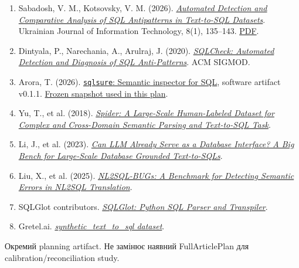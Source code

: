\documentclass[11pt,a4paper]{article}
\begin{document}
\begin{enumerate}
\item Sabadosh, V. M., Kotsovsky, V. M. (2026).
  \href{https://doi.org/10.23939/ujit2026.01.135}
  {\textit{Automated Detection and Comparative Analysis of SQL Antipatterns in
  Text-to-SQL Datasets}}. Ukrainian Journal of Information Technology, 8(1), 135--143.
  \href{https://science.lpnu.ua/sites/default/files/journal-paper/2026/apr/42369/15sabadoshkocovskiy135-143.pdf}{PDF}.
\item Dintyala, P., Narechania, A., Arulraj, J. (2020).
  \href{https://doi.org/10.1145/3318464.3389754}
  {\textit{SQLCheck: Automated Detection and Diagnosis of SQL Anti-Patterns}}.
  ACM SIGMOD.
\item Arora, T. (2026).
  \href{https://github.com/sqlsure/sqlsure}{\texttt{sqlsure}: Semantic inspector for SQL},
  software artifact v0.1.1.
  \href{https://github.com/sqlsure/sqlsure/tree/d1b98e741f848ce7d756ee1d672e206d6ec39daa}
  {Frozen snapshot used in this plan}.
\item Yu, T., et al. (2018).
  \href{https://doi.org/10.18653/v1/D18-1425}
  {\textit{Spider: A Large-Scale Human-Labeled Dataset for Complex and Cross-Domain
  Semantic Parsing and Text-to-SQL Task}}.
\item Li, J., et al. (2023).
  \href{https://proceedings.neurips.cc/paper_files/paper/2023/hash/83fc8fab1710363050bbd1d4b8cc0021-Abstract-Datasets_and_Benchmarks.html}
  {\textit{Can LLM Already Serve as a Database Interface? A Big Bench for
  Large-Scale Database Grounded Text-to-SQLs}}.
\item Liu, X., et al. (2025).
  \href{https://doi.org/10.1145/3711896.3737427}
  {\textit{NL2SQL-BUGs: A Benchmark for Detecting Semantic Errors in NL2SQL
  Translation}}.
\item SQLGlot contributors.
  \href{https://github.com/tobymao/sqlglot}{\textit{SQLGlot: Python SQL Parser and
  Transpiler}}.
\item Gretel.ai.
  \href{https://huggingface.co/datasets/gretelai/synthetic_text_to_sql}
  {\textit{synthetic\_text\_to\_sql dataset}}.
\end{enumerate}

\vfill
\begin{center}
\footnotesize\sffamily\color{accent}
Окремий planning artifact. Не замінює наявний FullArticlePlan для
calibration/reconciliation study.
\end{center}
\end{document}
